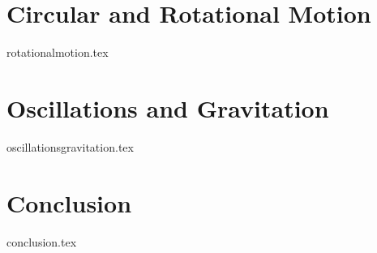 \documentclass{article}[gray]
\numberwithin{equation}{subsection}
\begin{document}
\section{Circular and Rotational Motion}
{rotationalmotion.tex}

\section{Oscillations and Gravitation}
{oscillationsgravitation.tex}

\section{Conclusion}
{conclusion.tex}
\end{document}
